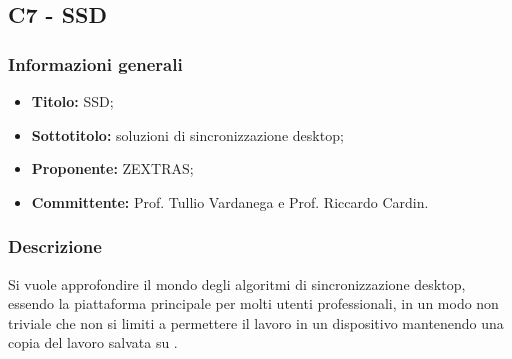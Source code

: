 \documentclass[]{article}
\begin{document}
		\newpage

        \subsection{C7 - SSD}
            \subsubsection{Informazioni generali}
            \begin{itemize}
                \item \textbf{Titolo:} SSD;
                \item \textbf{Sottotitolo:} soluzioni di sincronizzazione desktop;
                \item \textbf{Proponente:} ZEXTRAS;
                \item \textbf{Committente:} Prof. Tullio Vardanega e Prof. Riccardo Cardin.
            \end{itemize}

            \subsubsection{Descrizione}
            Si vuole approfondire il mondo degli algoritmi di sincronizzazione desktop, essendo la piattaforma principale per molti utenti professionali, in un modo non triviale che non si limiti a permettere il lavoro in un dispositivo mantenendo una copia del lavoro salvata su .
\end{document}
